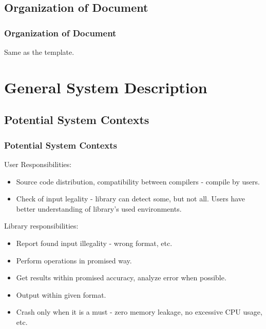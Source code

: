 \documentclass{beamer}
\begin{document}
	\subsection{Organization of Document}
	\begin{frame}
		\frametitle{Organization of Document}
		Same as the template.
	\end{frame}

	\section{General System Description}
	\subsection{Potential System Contexts}
	\begin{frame}
		\frametitle{Potential System Contexts}
		User Responsibilities:
		\begin{itemize}
			\item Source code distribution, compatibility between compilers - compile by users.
			\item Check of input legality - library can detect some, but not all. Users have better understanding of library's used environments.
		\end{itemize}
		Library responsibilities:
		\begin{itemize}
			\item Report found input illegality - wrong format, etc.
			\item Perform operations in promised way.
			\item Get results within promised accuracy, analyze error when possible.
			\item Output within given format.
			\item Crash only when it is a must - zero memory leakage, no excessive CPU usage, etc.
		\end{itemize}
	\end{frame}
\end{document}
